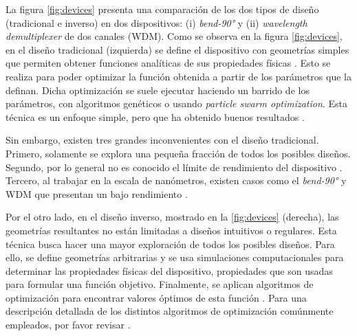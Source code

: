 La figura \ref{fig:devices} presenta una comparación de los dos tipos de diseño
(tradicional e inverso) en dos dispositivos: (i) \emph{bend-90°} y (ii)
\emph{wavelength demultiplexer} de dos canales (WDM).
Como se observa en la figura \ref{fig:devices}, en el diseño tradicional (izquierda) se define el dispositivo con geometrías simples que permiten obtener funciones analíticas de sus propiedades físicas \citep{Hughes2016, Song2008}. 
Esto se realiza para poder optimizar la función obtenida a partir de los parámetros que la definan. 
Dicha optimización se suele ejecutar haciendo un barrido de los parámetros, con algoritmos genéticos o usando \emph{particle swarm optimization}. 
Esta técnica es un enfoque simple, pero que ha obtenido buenos resultados
\citep{Su2020}. 


Sin embargo, existen tres grandes inconvenientes con el diseño tradicional. 
Primero, solamente se explora una pequeña fracción de todos los posibles diseños.
Segundo, por lo general no es conocido el límite de rendimiento del dispositivo
\citep{Molesky2018}.
Tercero, al trabajar en la escala de nanómetros, existen casos como el
\emph{bend-90°} y WDM que presentan un bajo rendimiento \citep{Su2020}.



Por el otro lado, en el diseño inverso, mostrado en la \autoref{fig:devices}
(derecha), las geometrías resultantes no están limitadas a diseños intuitivos o regulares.
Esta técnica busca hacer una mayor exploración de todos los posibles diseños.
Para ello, se define geometrías arbitrarias y se usa simulaciones
computacionales para determinar las propiedades físicas del dispositivo,
propiedades que son usadas para formular una función objetivo.
Finalmente, se aplican algoritmos de optimización para encontrar valores
óptimos de esta función \citep{Molesky2018, Su2020}.
Para una descripción detallada de los distintos algoritmos de optimización
comúnmente empleados, por favor revisar \cite{Schneider2019, Elsawy2020, Campbell2019}.

